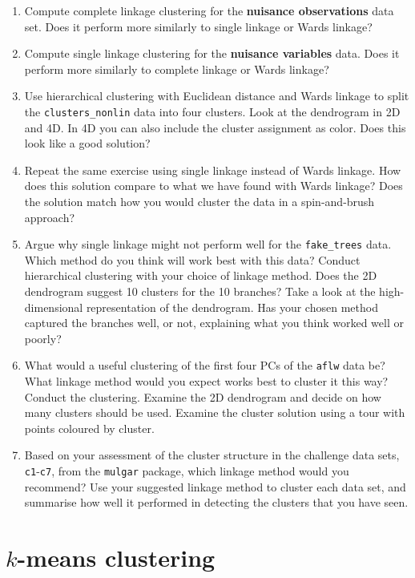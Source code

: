 \documentclass[
  letterpaper,
]{krantz}
\providecommand{\tightlist}{%
  \setlength{\itemsep}{0pt}\setlength{\parskip}{0pt}}
\begin{document}
\begin{enumerate}
\def\labelenumi{\arabic{enumi}.}
\tightlist
\item
  Compute complete linkage clustering for the \textbf{nuisance
  observations} data set. Does it perform more similarly to single
  linkage or Wards linkage?
\item
  Compute single linkage clustering for the \textbf{nuisance variables}
  data. Does it perform more similarly to complete linkage or Wards
  linkage?
\item
  Use hierarchical clustering with Euclidean distance and Wards linkage
  to split the \texttt{clusters\_nonlin} data into four clusters. Look
  at the dendrogram in 2D and 4D. In 4D you can also include the cluster
  assignment as color. Does this look like a good solution?
\item
  Repeat the same exercise using single linkage instead of Wards
  linkage. How does this solution compare to what we have found with
  Wards linkage? Does the solution match how you would cluster the data
  in a spin-and-brush approach?
\item
  Argue why single linkage might not perform well for the
  \texttt{fake\_trees} data. Which method do you think will work best
  with this data? Conduct hierarchical clustering with your choice of
  linkage method. Does the 2D dendrogram suggest 10 clusters for the 10
  branches? Take a look at the high-dimensional representation of the
  dendrogram. Has your chosen method captured the branches well, or not,
  explaining what you think worked well or poorly?
\item
  What would a useful clustering of the first four PCs of the
  \texttt{aflw} data be? What linkage method would you expect works best
  to cluster it this way? Conduct the clustering. Examine the 2D
  dendrogram and decide on how many clusters should be used. Examine the
  cluster solution using a tour with points coloured by cluster.
\item
  Based on your assessment of the cluster structure in the challenge
  data sets, \texttt{c1}-\texttt{c7}, from the \texttt{mulgar} package,
  which linkage method would you recommend? Use your suggested linkage
  method to cluster each data set, and summarise how well it performed
  in detecting the clusters that you have seen.
\end{enumerate}

\chapter{\texorpdfstring{\(k\)-means
clustering}{k-means clustering}}\label{sec-kmeans}
\end{document}
